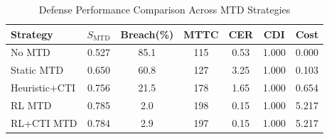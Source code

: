\begin{table}[!t]
\centering
\caption{Defense Performance Comparison Across MTD Strategies}
\label{tab:comparison}
\renewcommand{\arraystretch}{1.1}
\begin{tabular}{@{}lcccccc@{}}
\toprule
\textbf{Strategy} & $S_{\mathrm{MTD}}$ & \textbf{Breach(\%)} & \textbf{MTTC} & \textbf{CER} & \textbf{CDI} & \textbf{Cost} \\
\midrule
No MTD & 0.527 & 85.1 & 115 & 0.53 & 1.000 & 0.000 \\
Static MTD & 0.650 & 60.8 & 127 & 3.25 & 1.000 & 0.103 \\
Heuristic+CTI & 0.756 & 21.5 & 178 & 1.65 & 1.000 & 0.654 \\
RL MTD & 0.785 & 2.0 & 198 & 0.15 & 1.000 & 5.217 \\
RL+CTI MTD & 0.784 & 2.9 & 197 & 0.15 & 1.000 & 5.217 \\
\bottomrule
\end{tabular}
\end{table}
